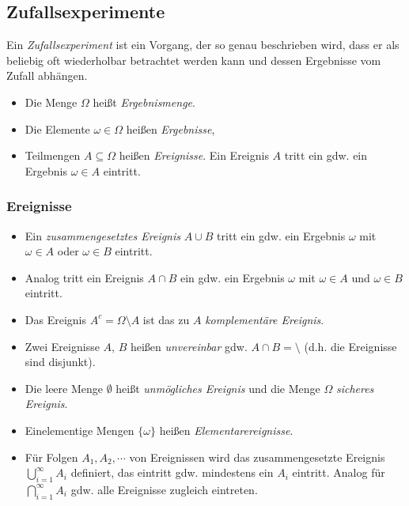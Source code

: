 		\subsection{Zufallsexperimente}
			Ein \textit{Zufallsexperiment} ist ein Vorgang, der so genau beschrieben wird, dass er als beliebig oft wiederholbar betrachtet werden kann und dessen Ergebnisse vom Zufall abhängen.

			\begin{itemize}
				\item Die Menge \(\Omega\) heißt \textit{Ergebnismenge}.
				\item Die Elemente \(\omega \in \Omega\) heißen \textit{Ergebnisse},
				\item Teilmengen \(A \subseteq \Omega\) heißen \textit{Ereignisse}. Ein Ereignis \(A\) tritt ein gdw. ein Ergebnis \( \omega \in A \) eintritt.
			\end{itemize}

			\subsubsection{Ereignisse}
				\begin{itemize}
					\item Ein \textit{zusammengesetztes Ereignis} \( A \cup B \) tritt ein gdw. ein Ergebnis \(\omega\) mit \(\omega \in A\) oder \(\omega \in B\) eintritt.
					\item Analog tritt ein Ereignis \( A \cap B \) ein gdw. ein Ergebnis \(\omega\) mit \(\omega \in A\) und \(\omega \in B\) eintritt.
					\item Das Ereignis \( A ^ c = \Omega \setminus A \) ist das zu \(A\) \textit{komplementäre Ereignis}.
					\item Zwei Ereignisse \(A\), \(B\) heißen \textit{unvereinbar} gdw. \( A \cap B = \setminus \) (d.h. die Ereignisse sind disjunkt).
					\item Die leere Menge \(\emptyset\) heißt \textit{unmögliches Ereignis} und die Menge \(\Omega\) \textit{sicheres Ereignis}.
					\item Einelementige Mengen \( \{ \omega \} \) heißen \textit{Elementarereignisse}.
					\item Für Folgen \( A_1, A_2, \cdots \) von Ereignissen wird das zusammengesetzte Ereignis \( \bigcup_{i = 1}^\infty A_i \) definiert, das eintritt gdw. mindestens ein \(A_i\) eintritt. Analog für \( \bigcap_{i = 1}^\infty A_i \) gdw. alle Ereignisse zugleich eintreten.
				\end{itemize}

